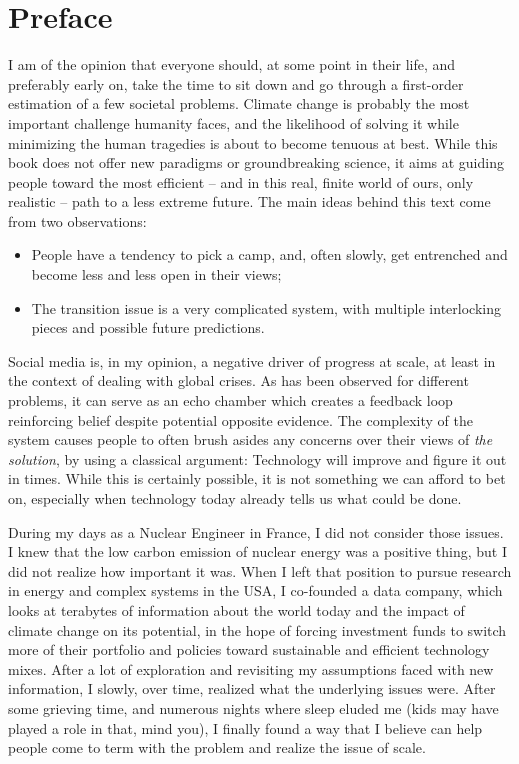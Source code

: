 \chapter*{Preface}

I am of the opinion that everyone should, at some point in their life, and preferably early on, take the time to sit down and go through a first-order estimation of a few societal problems. Climate change is probably the most important challenge humanity faces, and the likelihood of solving it while minimizing the human tragedies is about to become tenuous at best. While this book does not offer new paradigms or groundbreaking science, it aims at guiding people toward the most efficient -- and in this real, finite world of ours, only realistic -- path to a less extreme future. The main ideas behind this text come from two observations:

\begin{itemize}
	\item People have a tendency to pick a camp, and, often slowly, get entrenched and become less and less open in their views;
	\item The transition issue is a very complicated system, with multiple interlocking pieces and possible future predictions.
\end{itemize}

Social media is, in my opinion, a negative driver of progress at scale, at least in the context of dealing with global crises. As has been observed for different problems, it can serve as an echo chamber which creates a feedback loop reinforcing belief despite potential opposite evidence. The complexity of the system causes people to often brush asides any concerns over their views of \emph{the solution}, by using a classical argument: Technology will improve and figure it out in times. While this is certainly possible, it is not something we can afford to bet on, especially when technology today already tells us what could be done.

During my days as a Nuclear Engineer in France, I did not consider those issues. I knew that the low carbon emission of nuclear energy was a positive thing, but I did not realize how important it was. When I left that position to pursue research in energy and complex systems in the USA, I co-founded a data company, which looks at terabytes of information about the world today and the impact of climate change on its potential, in the hope of forcing investment funds to switch more of their portfolio and policies toward sustainable and efficient technology mixes. After a lot of exploration and revisiting my assumptions faced with new information, I slowly, over time, realized what the underlying issues were. After some grieving time, and numerous nights where sleep eluded me (kids may have played a role in that, mind you), I finally found a way that I believe can help people come to term with the problem and realize the issue of scale.

